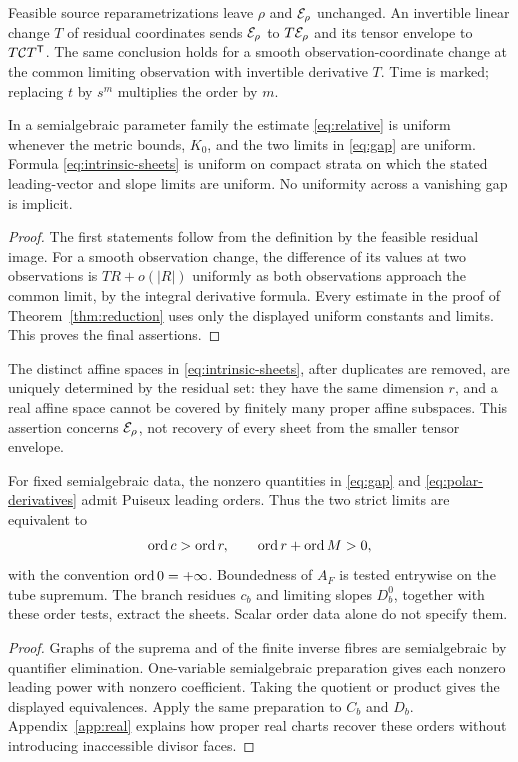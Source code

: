 \begin{corollary}\label{cor:invariance}
Feasible source reparametrizations leave $\rho$ and $\mathcal E_\rho$ unchanged. An invertible linear change $T$ of residual coordinates sends $\mathcal E_\rho$ to $T\mathcal E_\rho$ and its tensor envelope to $T\mathcal C T^{\mathsf T}$. The same conclusion holds for a smooth observation-coordinate change at the common limiting observation with invertible derivative $T$. Time is marked; replacing $t$ by $s^m$ multiplies the order by $m$.

In a semialgebraic parameter family the estimate \eqref{eq:relative} is uniform whenever the metric bounds, $K_0$, and the two limits in \eqref{eq:gap} are uniform. Formula \eqref{eq:intrinsic-sheets} is uniform on compact strata on which the stated leading-vector and slope limits are uniform. No uniformity across a vanishing gap is implicit.
\end{corollary}
\begin{proof}
The first statements follow from the definition by the feasible residual image. For a smooth observation change, the difference of its values at two observations is $TR+o(|R|)$ uniformly as both observations approach the common limit, by the integral derivative formula. Every estimate in the proof of Theorem~\ref{thm:reduction} uses only the displayed uniform constants and limits. This proves the final assertions.
\end{proof}
The distinct affine spaces in \eqref{eq:intrinsic-sheets}, after duplicates are removed, are uniquely determined by the residual set: they have the same dimension $r$, and a real affine space cannot be covered by finitely many proper affine subspaces. This assertion concerns $\mathcal E_\rho$, not recovery of every sheet from the smaller tensor envelope.

\begin{proposition}\label{prop:order-tests}
For fixed semialgebraic data, the nonzero quantities in \eqref{eq:gap} and \eqref{eq:polar-derivatives} admit Puiseux leading orders. Thus the two strict limits are equivalent to
\[
 \operatorname{ord} c>\operatorname{ord} r,\qquad \operatorname{ord} r+\operatorname{ord} M>0,
\]
with the convention $\operatorname{ord}0=+\infty$. Boundedness of $A_F$ is tested entrywise on the tube supremum. The branch residues $c_b$ and limiting slopes $D_b^0$, together with these order tests, extract the sheets. Scalar order data alone do not specify them.
\end{proposition}
\begin{proof}
Graphs of the suprema and of the finite inverse fibres are semialgebraic by quantifier elimination. One-variable semialgebraic preparation gives each nonzero leading power with nonzero coefficient. Taking the quotient or product gives the displayed equivalences. Apply the same preparation to $C_b$ and $D_b$. Appendix~\ref{app:real} explains how proper real charts recover these orders without introducing inaccessible divisor faces.
\end{proof}

